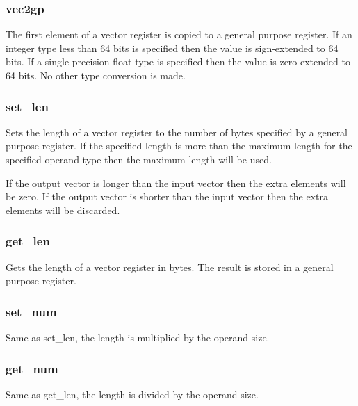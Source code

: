 \documentclass[forwardcom.tex]{subfiles}
\begin{document}
\subsubsection{vec2gp}
The first element of a vector register is copied to a general purpose register. If an integer type less than 64 bits is specified then the value is sign-extended to 64 bits. If a single-precision float type is specified then the value is zero-extended to 64 bits. No other type conversion is made.

\subsubsection{set\_len}
Sets the length of a vector register to the number of bytes specified by a general purpose register. If the specified length is more than the maximum length for the specified operand type then the maximum length will be used.
\vspace{2mm}

If the output vector is longer than the input vector then the extra elements will be zero. If the output vector is shorter than the input vector then the extra elements will be discarded. 

\subsubsection{get\_len}
Gets the length of a vector register in bytes. The result is stored in a general purpose register.

\subsubsection{set\_num}
Same as set\_len, the length is multiplied by the operand size.

\subsubsection{get\_num}
Same as get\_len, the length is divided by the operand size.
\end{document}
